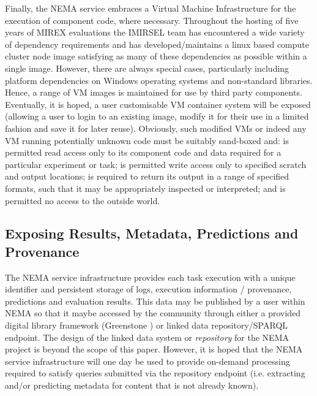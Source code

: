\documentclass[conference]{IEEEtran}
\begin{document}
Finally, the NEMA service embraces a Virtual Machine Infrastructure for the execution of component code, where necessary. Throughout the hosting of five years of MIREX evaluations the IMIRSEL team has encountered a wide variety of dependency requirements and has developed/maintains a linux based compute cluster node image satisfying as many of these dependencies as possible within a single image. However, there are always special cases, particularly including platform dependencies on Windows operating systems and non-standard libraries. Hence, a range of VM images is maintained for use by third party components.
Eventually, it is hoped, a user customisable VM container system will be exposed (allowing a user to login to an existing image, modify it for their use in a limited fashion and save it for later reuse).
Obviously, such modified VMs or indeed any VM running potentially unknown code must be suitably sand-boxed and: is permitted read access only to its component code and data required for a particular experiment or task; is permitted write access only to specified scratch and output locations; is required to return its output in a range of specified formats, such that it may be appropriately inspected or interpreted; and is permitted no access to the outside world.

\subsection{Exposing Results, Metadata, Predictions and Provenance}
The NEMA service infrastructure provides each task execution with a unique identifier and persistent storage of logs, execution information / provenance, predictions and evaluation results. This data may be published by a user within NEMA so that it maybe accessed by the community through either a provided digital library framework (Greenstone \cite{witten2000greenstone}) or linked data repository/SPARQL endpoint. 
The design of the linked data system or \emph{repository} for the NEMA project is beyond the scope of this paper. However, it is hoped that the NEMA service infrastructure will one day be used to provide on-demand processing required to satisfy queries submitted via the repository endpoint (i.e. extracting and/or predicting metadata for content that is not already known).
\end{document}
